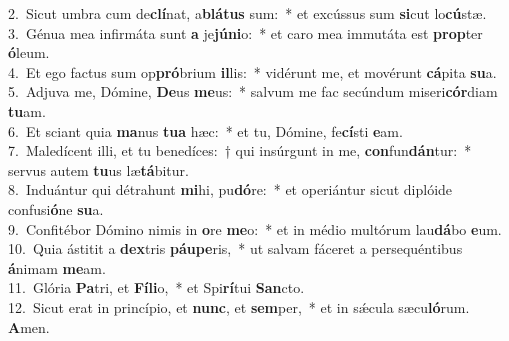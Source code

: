 {2.~}Sicut umbra cum de\textbf{clí}nat, a\textbf{blá}\textbf{tus} sum:~* et excússus sum \textbf{si}cut lo\textbf{cú}stæ.\\
{3.~}Génua mea infirmáta sunt \textbf{a} je\textbf{jú}\textbf{ni}o:~* et caro mea immutáta est \textbf{prop}ter \textbf{ó}leum.\\
{4.~}Et ego factus sum op\textbf{pró}brium \textbf{il}lis:~* vidérunt me, et movérunt \textbf{cá}pita \textbf{su}a.\\
{5.~}Adjuva me, Dómine, \textbf{De}us \textbf{me}us:~* salvum me fac secúndum miseri\textbf{cór}diam \textbf{tu}am.\\
{6.~}Et sciant quia \textbf{ma}nus \textbf{tu}\textbf{a} hæc:~* et tu, Dómine, fe\textbf{cí}sti \textbf{e}am.\\
{7.~}Maledícent illi, et tu benedíces:~† qui insúrgunt in me, \textbf{con}fun\textbf{dán}tur:~* servus autem \textbf{tu}us læ\textbf{tá}bitur.\\
{8.~}Induántur qui détrahunt \textbf{mi}hi, pu\textbf{dó}re:~* et operiántur sicut diplóide confusi\textbf{ó}ne \textbf{su}a.\\
{9.~}Confitébor Dómino nimis in \textbf{o}re \textbf{me}o:~* et in médio multórum lau\textbf{dá}bo \textbf{e}um.\\
{10.~}Quia ástitit a \textbf{dex}tris \textbf{páu}\textbf{pe}ris,~* ut salvam fáceret a persequéntibus \textbf{á}nimam \textbf{me}am.\\
{11.~}Glória \textbf{Pa}tri, et \textbf{Fí}\textbf{li}o,~* et Spi\textbf{rí}tui \textbf{San}cto.\\
{12.~}Sicut erat in princípio, et \textbf{nunc}, et \textbf{sem}per,~* et in sǽcula sæcu\textbf{ló}rum. \textbf{A}men.\\
